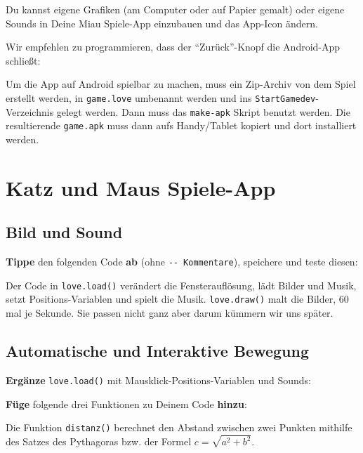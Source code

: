 \documentclass[a4paper, 11pt]{article}
\begin{document}
Du kannst eigene Grafiken (am Computer oder auf Papier gemalt) oder eigene Sounds in Deine Miau Spiele-App einzubauen und das App-Icon ändern.

Wir empfehlen zu programmieren, dass der "`Zurück"'-Knopf die Android-App schließt:



Um die App auf Android spielbar zu machen, muss ein Zip-Archiv von dem Spiel erstellt werden, in \texttt{game.love} umbenannt werden und ins \texttt{StartGamedev}-Verzeichnis gelegt werden. Dann muss das \texttt{make-apk} Skript benutzt werden. Die resultierende \texttt{game.apk} muss dann aufs Handy/Tablet kopiert und dort installiert werden.

\newpage

\section{Katz und Maus Spiele-App}

\subsection{Bild und Sound}

\textbf{Tippe} den folgenden Code \textbf{ab} (ohne \texttt{-{}- Kommentare}), speichere und teste diesen:



Der Code in \texttt{love.load()} verändert die Fensterauflösung, lädt Bilder und Musik, setzt Positions-Variablen und spielt die Musik. \texttt{love.draw()} malt die Bilder, 60 mal je Sekunde. Sie passen nicht ganz aber darum kümmern wir uns später.

\newpage

\subsection{Automatische und Interaktive Bewegung}

\textbf{Ergänze} \texttt{love.load()} mit Mausklick-Positions-Variablen und Sounds:



\textbf{Füge} folgende drei Funktionen zu Deinem Code \textbf{hinzu}:



Die Funktion \texttt{distanz()} berechnet den Abstand zwischen zwei Punkten mithilfe des Satzes des Pythagoras bzw. der Formel $c = \sqrt{a^2 + b^2}$.
\end{document}
